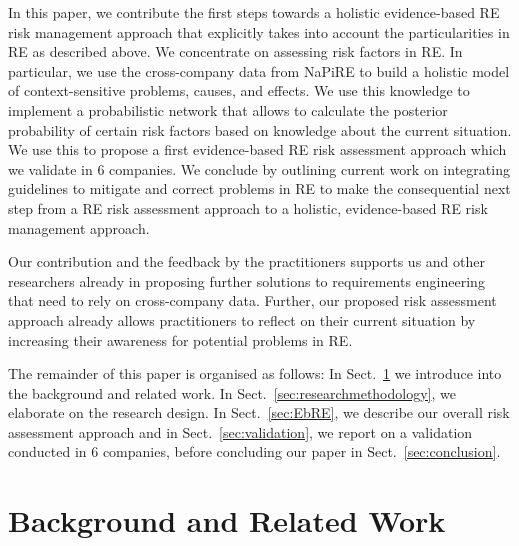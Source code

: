 \documentclass[lnbip]{svmultln}
\begin{document}
In this paper, we contribute the first steps towards a holistic evidence-based RE risk management approach that explicitly takes into account the particularities in RE as described above. We concentrate on assessing risk factors in RE. In particular, we use the cross-company data from NaPiRE to build a holistic model of context-sensitive problems, causes, and effects. We use this knowledge to implement a probabilistic network that allows to calculate the posterior probability of certain risk factors based on knowledge about the current situation. We use this to propose a first evidence-based RE risk assessment approach which we validate in 6 companies. We conclude by outlining current work on integrating guidelines to mitigate and correct problems in RE to make the consequential next step from a RE risk assessment approach to a holistic, evidence-based RE risk management approach. 

Our contribution and the feedback by the practitioners supports us and other researchers already in proposing further solutions to requirements engineering that need to rely on cross-company data. Further, our proposed risk assessment approach already allows practitioners to reflect on their current situation by increasing their awareness for potential problems in RE.

The remainder of this paper is organised as follows: In Sect.~\ref{sec:relatedwork} we introduce into the background and related work. In Sect.~\ref{sec:researchmethodology}, we elaborate on the research design. In Sect.~\ref{sec:EbRE}, we describe our overall risk assessment approach and in Sect.~\ref{sec:validation}, we report on a validation conducted in 6 companies, before concluding our paper in Sect.~\ref{sec:conclusion}.


\section{Background and Related Work}
\label{sec:relatedwork}
\end{document}
